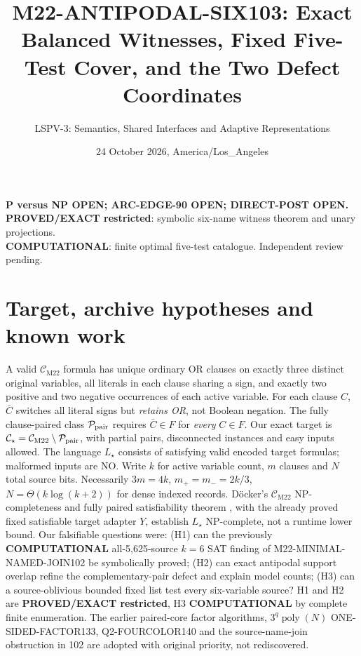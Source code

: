 \documentclass[11pt]{article}
\title{M22-ANTIPODAL-SIX103: Exact Balanced Witnesses, Fixed Five-Test Cover, and the Two Defect Coordinates}
\author{LSPV-3: Semantics, Shared Interfaces and Adaptive Representations}
\date{24 October 2026, America/Los\_Angeles}
\newcommand{\CM}{\mathcal C_{\mathrm{M22}}}
\newcommand{\CS}{\mathcal C_{\star}}
\begin{document}
\maketitle
\begin{center}
\textbf{P versus NP OPEN; ARC-EDGE-90 OPEN; DIRECT-POST OPEN.}\\
\textbf{PROVED/EXACT restricted}: symbolic six-name witness theorem and unary projections.\\
\textbf{COMPUTATIONAL}: finite optimal five-test catalogue. Independent review pending.
\end{center}
\section{Target, archive hypotheses and known work}
A valid \(\CM\) formula has unique ordinary OR clauses on exactly three distinct original variables, all literals in each clause sharing a sign, and exactly two positive and two negative occurrences of each active variable. For each clause \(C\), \(\bar C\) switches all literal signs but \emph{retains OR}, not Boolean negation. The fully clause-paired class \(\mathcal P_{\rm pair}\) requires \(\bar C\in F\) for \emph{every} \(C\in F\). Our exact target is \(\CS=\CM\setminus\mathcal P_{\rm pair}\), with partial pairs, disconnected instances and easy inputs allowed. The language \(L_\star\) consists of satisfying valid encoded target formulas; malformed inputs are NO. Write \(k\) for active variable count, \(m\) clauses and \(N\) total source bits. Necessarily \(3m=4k\), \(m_+=m_-=2k/3\), \(N=\Theta(k\log(k+2))\) for dense indexed records. D\"ocker's \(\CM\) NP-completeness and fully paired satisfiability theorem \cite{docker}, with the already proved fixed satisfiable target adapter \(Y\), establish \(L_\star\) NP-complete, not a runtime lower bound.
Our falsifiable questions were: (H1) can the previously \textbf{COMPUTATIONAL} all-5,625-source \(k=6\) SAT finding of M22-MINIMAL-NAMED-JOIN102 be symbolically proved; (H2) can exact antipodal support overlap refine the complementary-pair defect and explain model counts; (H3) can a source-oblivious bounded fixed list test every six-variable source? H1 and H2 are \textbf{PROVED/EXACT restricted}, H3 \textbf{COMPUTATIONAL} by complete finite enumeration. The earlier paired-core factor algorithms, \(3^q\operatorname{poly}(N)\) ONE-SIDED-FACTOR133, Q2-FOURCOLOR140 and the source-name-join obstruction in 102 are adopted with original priority, not rediscovered.
\end{document}
